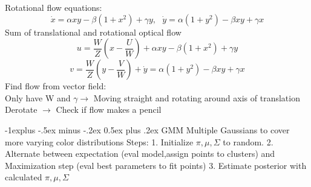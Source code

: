 \documentclass[10pt,landscape]{article}
\makeatletter
\renewcommand{\subsection}{\@startsection{subsection}{2}{0mm}%
                                {-1explus -.5ex minus -.2ex}%
                                {0.5ex plus .2ex}%
                                {\normalfont\normalsize\bfseries}}
\makeatother
\begin{document}
\begin{multicols}{3}
Rotational flow equations:
$$
\dot{x} = \alpha x y - \beta(1+x^2) + \gamma y,\text{  } 
\dot{y} = \alpha(1 + y^2) - \beta x y + \gamma x
$$
Sum of translational and rotational optical flow
$$
u = \frac{W}{Z} (x - \frac{U}{W}) + \alpha x y - \beta(1+x^2) + \gamma y 
$$
$$
v = \frac{W}{Z} (y - \frac{V}{W}) + \dot{y} = \alpha(1 + y^2) - \beta x y + \gamma x
$$
Find flow from vector field: \\
Only have W and $\gamma \rightarrow$  Moving straight and rotating around axis of translation \\
Derotate $\rightarrow$ Check if flow makes a pencil

\subsection{GMM}
Multiple Gaussians to cover more varying color distributions
Steps: 1. Initialize $\pi, \mu, \Sigma$ to random. 
2. Alternate between expectation (eval model,assign points to clusters) and Maximization step (eval best parameters to fit points)
3. Estimate posterior with calculated $\pi, \mu, \Sigma$

\end{multicols}
\end{document}
